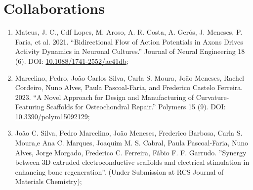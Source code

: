 \section{Collaborations}
\begin{enumerate}
\item \small Mateus, J. C., Cdf Lopes, M. Aroso, A. R. Costa, A. Gerós, J. Meneses, P. Faria, et al. 2021. “Bidirectional Flow of Action Potentials in Axons Drives Activity Dynamics in Neuronal Cultures.” Journal of Neural Engineering 18 (6). DOI: \href{https://doi.org/10.1088/1741-2552/ac41db}{10.1088/1741-2552/ac41db};
\item \small Marcelino, Pedro, João Carlos Silva, Carla S. Moura, João Meneses, Rachel Cordeiro, Nuno Alves, Paula Pascoal-Faria, and Frederico Castelo Ferreira. 2023. “A Novel Approach for Design and Manufacturing of Curvature-Featuring Scaffolds for Osteochondral Repair.” Polymers 15 (9). DOI: \href{https://doi.org/10.3390/polym15092129}{10.3390/polym15092129};
\item \small João C. Silva, Pedro Marcelino, João Meneses, Frederico Barbosa, Carla S. Moura,e Ana C. Marques, Joaquim M. S. Cabral, Paula Pascoal-Faria, Nuno Alves, Jorge Morgado, Frederico C. Ferreira, Fábio F. F. Garrudo. ''Synergy between 3D-extruded electroconductive scaffolds and electrical stimulation in enhancing bone regeneration''. (Under Submission at RCS Journal of Materials Chemistry);
\end{enumerate}



%
